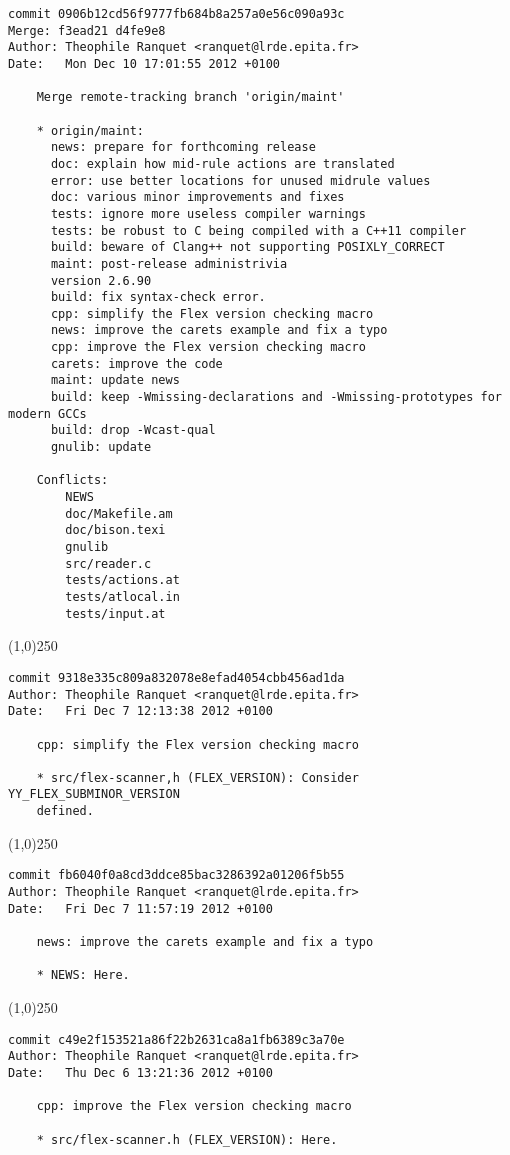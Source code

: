 \begin{verbatim}
commit 0906b12cd56f9777fb684b8a257a0e56c090a93c
Merge: f3ead21 d4fe9e8
Author: Theophile Ranquet <ranquet@lrde.epita.fr>
Date:   Mon Dec 10 17:01:55 2012 +0100

    Merge remote-tracking branch 'origin/maint'
    
    * origin/maint:
      news: prepare for forthcoming release
      doc: explain how mid-rule actions are translated
      error: use better locations for unused midrule values
      doc: various minor improvements and fixes
      tests: ignore more useless compiler warnings
      tests: be robust to C being compiled with a C++11 compiler
      build: beware of Clang++ not supporting POSIXLY_CORRECT
      maint: post-release administrivia
      version 2.6.90
      build: fix syntax-check error.
      cpp: simplify the Flex version checking macro
      news: improve the carets example and fix a typo
      cpp: improve the Flex version checking macro
      carets: improve the code
      maint: update news
      build: keep -Wmissing-declarations and -Wmissing-prototypes for modern GCCs
      build: drop -Wcast-qual
      gnulib: update
    
    Conflicts:
    	NEWS
    	doc/Makefile.am
    	doc/bison.texi
    	gnulib
    	src/reader.c
    	tests/actions.at
    	tests/atlocal.in
    	tests/input.at

\end{verbatim}
\line(1,0){250}
\begin{verbatim}
commit 9318e335c809a832078e8efad4054cbb456ad1da
Author: Theophile Ranquet <ranquet@lrde.epita.fr>
Date:   Fri Dec 7 12:13:38 2012 +0100

    cpp: simplify the Flex version checking macro
    
    * src/flex-scanner,h (FLEX_VERSION): Consider YY_FLEX_SUBMINOR_VERSION
    defined.

\end{verbatim}
\line(1,0){250}
\begin{verbatim}
commit fb6040f0a8cd3ddce85bac3286392a01206f5b55
Author: Theophile Ranquet <ranquet@lrde.epita.fr>
Date:   Fri Dec 7 11:57:19 2012 +0100

    news: improve the carets example and fix a typo
    
    * NEWS: Here.

\end{verbatim}
\line(1,0){250}
\begin{verbatim}
commit c49e2f153521a86f22b2631ca8a1fb6389c3a70e
Author: Theophile Ranquet <ranquet@lrde.epita.fr>
Date:   Thu Dec 6 13:21:36 2012 +0100

    cpp: improve the Flex version checking macro
    
    * src/flex-scanner.h (FLEX_VERSION): Here.

\end{verbatim}
